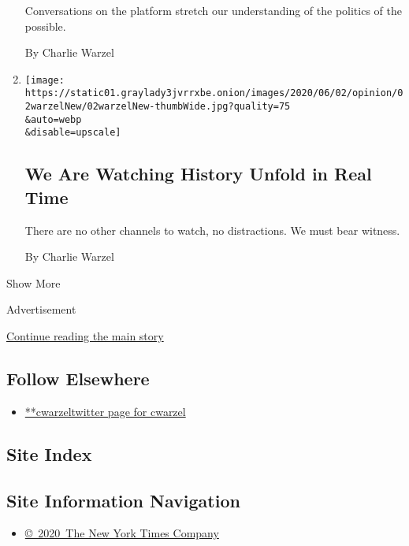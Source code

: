\begin{enumerate}
  Conversations on the platform stretch our understanding of the
  politics of the possible.

  By Charlie Warzel
\item
  \href{/2020/06/02/opinion/floyd-protest-twitter.html}{}

  \texttt{[image: https://static01.graylady3jvrrxbe.onion/images/2020/06/02/opinion/02warzelNew/02warzelNew-thumbWide.jpg?quality=75\\\&auto=webp\\\&disable=upscale]}

  \hypertarget{we-are-watching-history-unfold-in-real-time}{%
  \subsection{We Are Watching History Unfold in Real
  Time}\label{we-are-watching-history-unfold-in-real-time}}

  There are no other channels to watch, no distractions. We must bear
  witness.

  By Charlie Warzel
\end{enumerate}

Show More

Advertisement

\protect\hyperlink{after-mid2}{Continue reading the main story}

\hypertarget{follow-elsewhere}{%
\subsection{Follow Elsewhere}\label{follow-elsewhere}}

\begin{itemize}
\tightlist
\item
  \href{https://twitter.com/cwarzel}{**cwarzeltwitter page for cwarzel}
\end{itemize}

\hypertarget{site-index}{%
\subsection{Site Index}\label{site-index}}

\hypertarget{site-information-navigation}{%
\subsection{Site Information
Navigation}\label{site-information-navigation}}

\begin{itemize}
\tightlist
\item
  \href{https://help.nytimes3xbfgragh.onion/hc/en-us/articles/115014792127-Copyright-notice}{©~2020~The
  New York Times Company}
\end{itemize}

